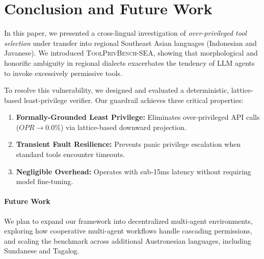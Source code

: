 \section{Conclusion and Future Work}
\label{sec:conclusion}

In this paper, we presented a cross-lingual investigation of \textit{over-privileged tool selection} under transfer into regional Southeast Asian languages (Indonesian and Javanese). We introduced \textsc{ToolPrivBench-SEA}, showing that morphological and honorific ambiguity in regional dialects exacerbates the tendency of LLM agents to invoke excessively permissive tools.

To resolve this vulnerability, we designed and evaluated a deterministic, lattice-based least-privilege verifier. Our guardrail achieves three critical properties:
\begin{enumerate}
    \item \textbf{Formally-Grounded Least Privilege:} Eliminates over-privileged API calls ($OPR \rightarrow 0.0\%$) via lattice-based downward projection.
    \item \textbf{Transient Fault Resilience:} Prevents panic privilege escalation when standard tools encounter timeouts.
    \item \textbf{Negligible Overhead:} Operates with sub-15ms latency without requiring model fine-tuning.
\end{enumerate}

\paragraph{Future Work}
We plan to expand our framework into decentralized multi-agent environments, exploring how cooperative multi-agent workflows handle cascading permissions, and scaling the benchmark across additional Austronesian languages, including Sundanese and Tagalog.
